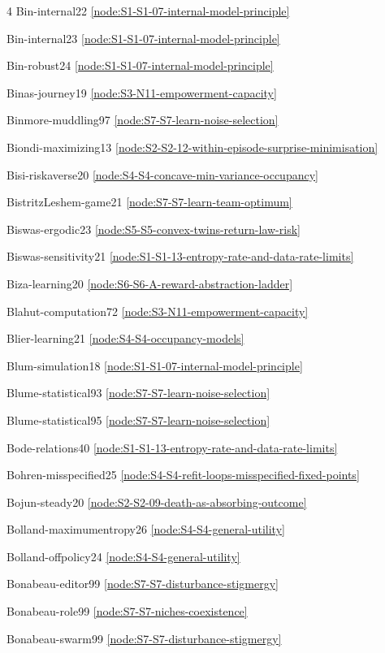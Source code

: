 \documentclass[10pt]{article}
\begin{document}
{\begin{multicols}{4}
Bin-internal22 \hfill \ref{node:S1-S1-07-internal-model-principle}\par
Bin-internal23 \hfill \ref{node:S1-S1-07-internal-model-principle}\par
Bin-robust24 \hfill \ref{node:S1-S1-07-internal-model-principle}\par
Binas-journey19 \hfill \ref{node:S3-N11-empowerment-capacity}\par
Binmore-muddling97 \hfill \ref{node:S7-S7-learn-noise-selection}\par
Biondi-maximizing13 \hfill \ref{node:S2-S2-12-within-episode-surprise-minimisation}\par
Bisi-riskaverse20 \hfill \ref{node:S4-S4-concave-min-variance-occupancy}\par
BistritzLeshem-game21 \hfill \ref{node:S7-S7-learn-team-optimum}\par
Biswas-ergodic23 \hfill \ref{node:S5-S5-convex-twins-return-law-risk}\par
Biswas-sensitivity21 \hfill \ref{node:S1-S1-13-entropy-rate-and-data-rate-limits}\par
Biza-learning20 \hfill \ref{node:S6-S6-A-reward-abstraction-ladder}\par
Blahut-computation72 \hfill \ref{node:S3-N11-empowerment-capacity}\par
Blier-learning21 \hfill \ref{node:S4-S4-occupancy-models}\par
Blum-simulation18 \hfill \ref{node:S1-S1-07-internal-model-principle}\par
Blume-statistical93 \hfill \ref{node:S7-S7-learn-noise-selection}\par
Blume-statistical95 \hfill \ref{node:S7-S7-learn-noise-selection}\par
Bode-relations40 \hfill \ref{node:S1-S1-13-entropy-rate-and-data-rate-limits}\par
Bohren-misspecified25 \hfill \ref{node:S4-S4-refit-loops-misspecified-fixed-points}\par
Bojun-steady20 \hfill \ref{node:S2-S2-09-death-as-absorbing-outcome}\par
Bolland-maximumentropy26 \hfill \ref{node:S4-S4-general-utility}\par
Bolland-offpolicy24 \hfill \ref{node:S4-S4-general-utility}\par
Bonabeau-editor99 \hfill \ref{node:S7-S7-disturbance-stigmergy}\par
Bonabeau-role99 \hfill \ref{node:S7-S7-niches-coexistence}\par
Bonabeau-swarm99 \hfill \ref{node:S7-S7-disturbance-stigmergy}\par

\end{multicols}}
\end{document}
